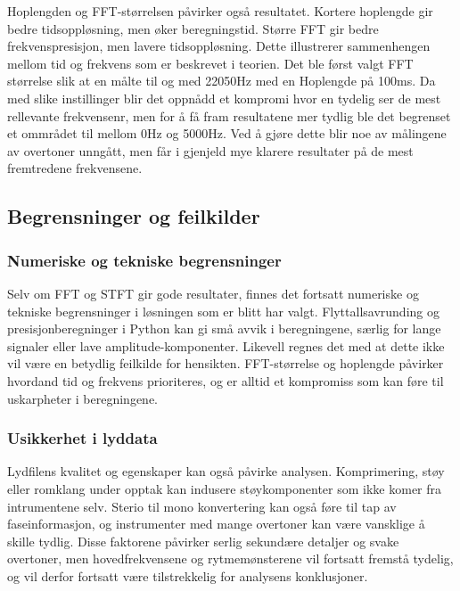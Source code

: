 Hoplengden og FFT-størrelsen påvirker også resultatet. Kortere hoplengde gir bedre tidsoppløsning, men øker beregningstid. 
Større FFT gir bedre frekvenspresisjon, men lavere tidsoppløsning. Dette illustrerer sammenhengen mellom tid og frekvens som er 
beskrevet i teorien. Det ble først valgt FFT størrelse slik at en målte til og med 22050Hz med en Hoplengde på 100ms. Da med slike 
instillinger blir det oppnådd et kompromi hvor en tydelig ser de mest rellevante frekvensenr, men for å få fram resultatene mer tydlig ble det
begrenset et ommrådet til mellom 0Hz og 5000Hz. Ved å gjøre dette blir noe av målingene av overtoner unngått, men får i gjenjeld mye 
klarere resultater på de mest fremtredene frekvensene. 



\subsection{Begrensninger og feilkilder}

\subsubsection{Numeriske og tekniske begrensninger}
Selv om FFT og STFT gir gode resultater, finnes det fortsatt numeriske og tekniske begrensninger i løsningen som er blitt har valgt. Flyttallsavrunding og presisjonberegninger i Python kan gi små avvik i beregningene, særlig for lange signaler eller lave amplitude-komponenter. Likevell regnes det med at dette ikke vil være en betydlig feilkilde for hensikten. 
FFT-størrelse og hoplengde påvirker hvordand tid og frekvens prioriteres, og er alltid et kompromiss som kan føre til uskarpheter i beregningene. 

\subsubsection{Usikkerhet i lyddata}
Lydfilens kvalitet og egenskaper kan også påvirke analysen. Komprimering, støy eller romklang under opptak kan indusere støykomponenter som ikke komer fra intrumentene selv. Sterio til mono konvertering kan også føre til tap av faseinformasjon, og instrumenter med mange overtoner kan være vansklige å skille tydlig. Disse faktorene påvirker serlig sekundære detaljer og svake overtoner, men hovedfrekvensene og rytmemønsterene vil fortsatt fremstå tydelig, og vil derfor fortsatt være tilstrekkelig for analysens konklusjoner.



